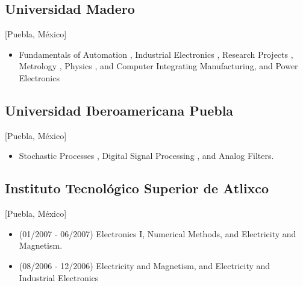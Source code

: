 \documentclass{mycv}
\begin{document}
\subsection{Universidad Madero}[Puebla, M\'exico]
\begin{positions}
\end{positions}
\begin{itemize}
	\item Fundamentals of Automation \href{https://sites.google.com/site/perezxochicale/digital-electronics}{\faExternalLink}, 
	Industrial Electronics \href{https://sites.google.com/site/perezxochicale/ie}{\faExternalLink},
	Research Projects \href{https://sites.google.com/site/perezxochicale/latex/thesistemplate}{\faExternalLink},
	Metrology \href{https://sites.google.com/site/perezxochicale/metrology}{\faExternalLink},
	Physics \href{http://goo.gl/fffnG}{\faExternalLink}, and 
	Computer Integrating Manufacturing, and Power Electronics
\end{itemize}

\subsection{Universidad Iberoamericana Puebla}[Puebla, M\'exico]
\begin{positions}
\end{positions}
\begin{itemize}
	\item Stochastic Processes \href{https://sites.google.com/site/perezxochicale/stochastic-processes-course}{\faExternalLink}, 
	Digital Signal Processing \href{https://sites.google.com/site/perezxochicale/digital-signal-processing-course}{\faExternalLink}, 
	and Analog Filters.
\end{itemize}

\subsection{Instituto Tecnol\'ogico Superior de Atlixco}[Puebla, M\'exico]
\begin{positions}
\end{positions}
\begin{itemize}
	\item (01/2007 - 06/2007) Electronics I, Numerical Methods, and Electricity and Magnetism. 
	\item (08/2006 - 12/2006) Electricity and Magnetism, and Electricity and Industrial Electronics 
\end{itemize}
\end{document}
